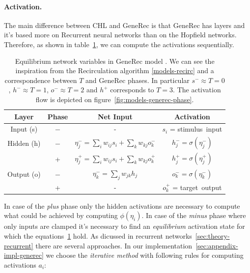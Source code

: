 \paragraph{Activation.} 
The main difference between CHL and GeneRec is that GeneRec has layers and it's based more on Recurrent neural networks than on the Hopfield networks. Therefore, as shown in table~\ref{tab:models-generec}, we can compute the activations sequentially. 
\begin{table}
  \centering
  \begin{tabular}{|cccc|}
    \hline
    Layer & Phase & Net Input & Activation\\
    \hline
    Input (s)    & $-$ & - & $s_i$ = \mbox{stimulus input} \\
    \hline
    Hidden (h)   & $-$ & \hspace{0.3cm}$\eta^{-}_j = \sum_i w_{ij}s_i + \sum_k w_{kj}o^{-}_k$\hspace{0.3cm} &
    $h^{-}_j = \sigma(\eta^{-}_j)$\hspace{0.3cm}\\
          &  +  & $\eta^{+}_j = \sum_{i}w_{ij}s_i + \sum_k w_{kj}o^{+}_k$ & $h^{+}_{j} = \sigma(\eta^{+}_j)$ \\
    \hline
    Output (o) & $-$ & $\eta^{-}_k = \sum_j w_{jk}h_j$ & $o^{-}_k = \sigma(\eta^{-}_k)$\\
           &  +  & - & $o^{+}_k$ = \mbox{target output} \\
    \hline
  \end{tabular}
  \caption{Equilibrium network variables in GeneRec model \citet{o1996bio}. We can see the inspiration from the Recirculation algorithm \ref{models-recirc} and a correspondence between $T$ and GeneRec phases. In particular $s^{-} \approx T=0$, $h^{-} \approx T=1$, $o^{-} \approx T=2$ and $h^{+}$ corresponds to $T=3$. The activation flow is depicted on figure~\ref{fig:models-generec-phase}.}
  \label{tab:models-generec}
\end{table}
In case of the \emph{plus} phase only the hidden activations are necessary to compute what could be achieved by computing $\phi(\eta_i)$. In case of the \emph{minus} phase where only inputs are clamped it's necessary to find an \emph{equilibrium} activation state for which the equations~\ref{tab:models-generec} hold. As dicussed in recurrent networks~\ref{sec:theory-recurrent} there are several approaches. In our implementation~\ref{sec:appendix-impl-generec} we choose the \emph{iterative method} with following rules for computing activations $a_i$: 
